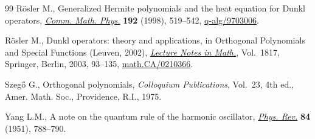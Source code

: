 \documentclass[11pt]{article}
\begin{document}
\begin{thebibliography}{99}
R{\"o}sler M., Generalized {H}ermite polynomials and the heat equation for
  {D}unkl operators, \href{http://dx.doi.org/10.1007/s002200050307}{\textit{Comm. Math. Phys.}} \textbf{192} (1998), 519--542,
  \href{http://arxiv.org/abs/q-alg/9703006}{q-alg/9703006}.

R{\"o}sler M., Dunkl operators: theory and applications, in Orthogonal
  Polynomials and Special Functions ({L}euven, 2002), \href{http://dx.doi.org/10.1007/3-540-44945-0_3}{\textit{Lecture Notes in
  Math.}}, Vol.~1817, Springer, Berlin, 2003, 93--135,
  \href{http://arxiv.org/abs/math.CA/0210366}{math.CA/0210366}.

Szeg{\H{o}} G., Orthogonal polynomials, \textit{Colloquium Publications},
  Vol.~23, 4th ed., Amer. Math. Soc., Providence, R.I., 1975.

Yang L.M., A note on the quantum rule of the harmonic oscillator, \href{http://dx.doi.org/10.1103/PhysRev.84.788}{\textit{Phys.
  Rev.}} \textbf{84} (1951), 788--790.

\end{thebibliography}
\end{document}
